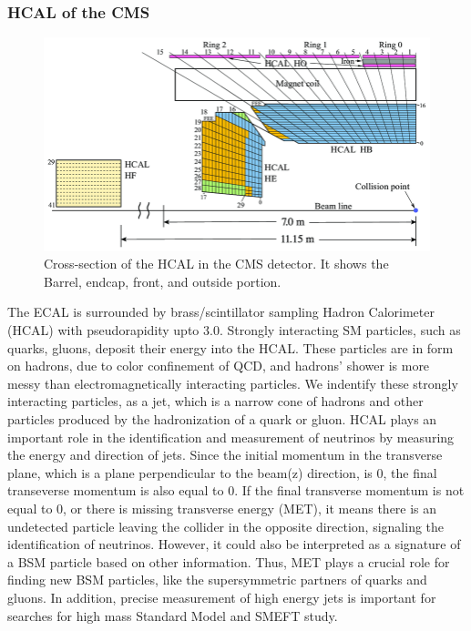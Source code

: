 \subsubsection{HCAL of the CMS}
\begin{figure}[h!]
  \caption{Cross-section of the HCAL in the CMS detector. It shows the Barrel, endcap, front, and outside portion. \cite{hcal}}
  \label{fig:HCAL}
  \centering
  \includegraphics[width=0.87\linewidth]{figs/HCAL.png}
\end{figure}
The ECAL is surrounded by brass/scintillator sampling Hadron Calorimeter (HCAL) with pseudorapidity upto 3.0.
Strongly interacting SM particles, such as quarks, gluons, deposit their energy into the HCAL.
These particles are in form on hadrons, due to color confinement of QCD, and hadrons' shower is more messy than electromagnetically interacting particles.
We indentify these strongly interacting particles, as a jet, which is a narrow cone of hadrons and other particles produced by the hadronization of a quark or gluon.
HCAL plays an important role in the identification and measurement of neutrinos by measuring the energy and direction of jets.
Since the initial momentum in the transverse plane, which is a plane perpendicular to the beam(z) direction, is 0, the final transeverse momentum is also equal to 0.
If the final transverse momentum is not equal to 0, or there is missing transverse energy (MET), it means there is an undetected particle leaving the collider in the opposite direction, signaling the identification of neutrinos.
However, it could also be interpreted as a signature of a BSM particle based on other information.
Thus, MET plays a crucial role for finding new BSM particles, like the supersymmetric partners of quarks and gluons.
In addition, precise measurement of high energy jets is important for searches for high mass Standard Model and SMEFT study.

